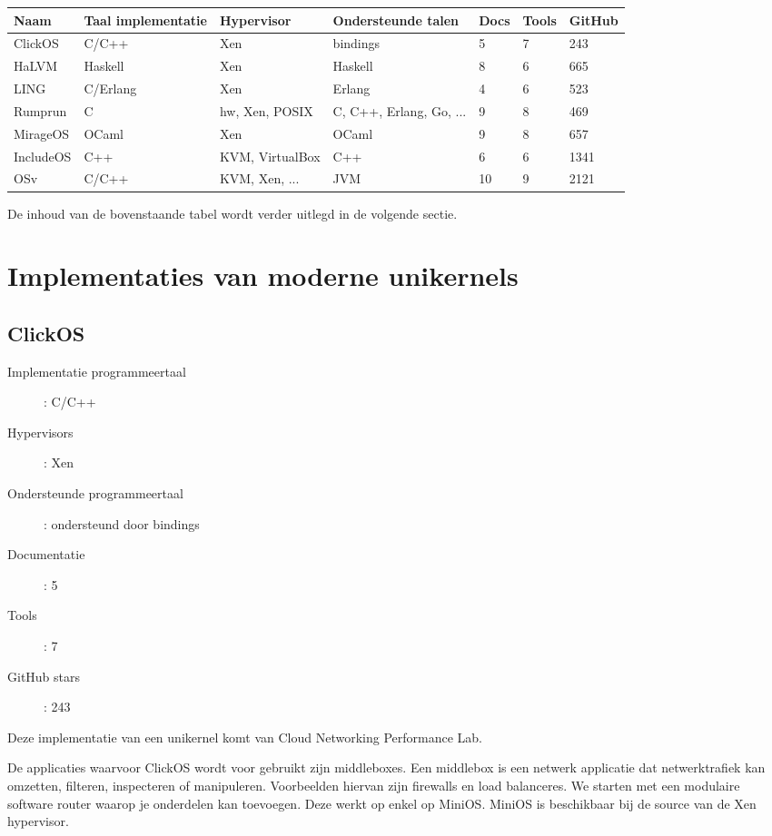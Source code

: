 \documentclass[pdftex,a4paper,12pt,twoside]{report}
\begin{document}
{\footnotesize
\begin{center}
    \begin{tabular}{| l | l | l | l | l | l | l |}
    \hline
    Naam & Taal implementatie & Hypervisor & Ondersteunde talen & Docs & Tools & GitHub \\ \hline
    ClickOS & C/C++ & Xen & bindings & 5 & 7 & 243 \\ \hline
    HaLVM & Haskell & Xen & Haskell & 8 & 6 & 665 \\ \hline
    LING & C/Erlang & Xen & Erlang & 4 & 6 & 523 \\ \hline
    Rumprun & C & hw, Xen, POSIX & C, C++, Erlang, Go, ... & 9 & 8 & 469 \\ \hline
    MirageOS & OCaml & Xen & OCaml & 9 & 8 & 657 \\ \hline
    IncludeOS & C++ & KVM, VirtualBox & C++ & 6 & 6 & 1341 \\ \hline
    OSv & C/C++ & KVM, Xen, ... & JVM & 10 & 9 & 2121 \\ \hline
    \end{tabular}
\end{center} 
}

De inhoud van de bovenstaande tabel wordt verder uitlegd in de volgende sectie.

\newpage

\section{Implementaties van moderne unikernels}

\subsection{ClickOS}
\begin{description}
  \item [Implementatie programmeertaal]: C/C++
  \item [Hypervisors]: Xen
  \item [Ondersteunde programmeertaal]: ondersteund door bindings
  \item [Documentatie]: 5
  \item [Tools]: 7
  \item [GitHub stars]: 243
\end{description}

Deze implementatie van een unikernel komt van Cloud Networking Performance Lab.

De applicaties waarvoor ClickOS wordt voor gebruikt zijn middleboxes. Een middlebox is een netwerk applicatie dat netwerktrafiek kan omzetten, filteren, inspecteren of manipuleren. Voorbeelden hiervan zijn firewalls en load balanceres.
We starten met een modulaire software router waarop je onderdelen kan toevoegen. Deze werkt op enkel op MiniOS. MiniOS is beschikbaar bij de source van de Xen hypervisor.
\end{document}
